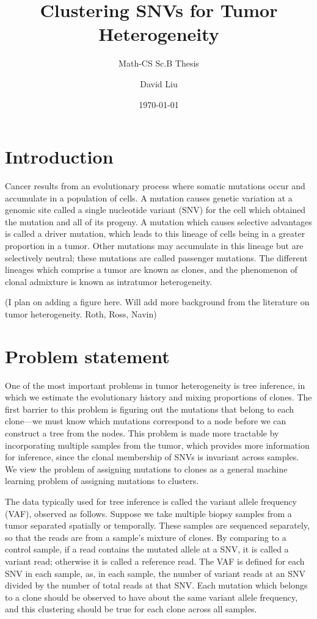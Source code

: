 \documentclass[11pt]{article}
\title{Clustering SNVs for Tumor Heterogeneity}
\subtitle{Math-CS Sc.B Thesis}
\date{\today}
\author{David Liu}
\begin{document}
\maketitle
\section{Introduction}
Cancer results from an evolutionary process where somatic mutations occur and accumulate in a population of cells. A mutation causes genetic variation at a genomic site called a single nucleotide variant (SNV) for the cell which obtained the mutation and all of its progeny. A mutation which causes selective advantages is called a driver mutation, which leads to this lineage of cells being in a greater proportion in a tumor. Other mutations may accumulate in this lineage but are selectively neutral; these mutations are called passenger mutations. The different lineages which comprise a tumor are known as clones, and the phenomenon of clonal admixture is known as intratumor heterogeneity. 

(I plan on adding a figure here. Will add more background from the literature on tumor heterogeneity. Roth, Ross, Navin)

\section{Problem statement}
One of the most important problems in tumor heterogeneity is tree inference, in which we estimate the evolutionary history and mixing proportions of clones. The first barrier to this problem is figuring out the mutations that belong to each clone---we must know which mutations correspond to a node before we can construct a tree from the nodes. This problem is made more tractable by incorporating multiple samples from the tumor, which provides more information for inference, since the clonal membership of SNVs is invariant across samples. We view the problem of assigning mutations to clones as a general machine learning problem of assigning mutations to clusters.

The data typically used for tree inference is called the variant allele frequency (VAF), observed as follows. Suppose we take multiple biopsy samples from a tumor separated spatially or temporally. These samples are sequenced separately, so that the reads are from a sample's mixture of clones. By comparing to a control sample, if a read contains the mutated allele at a SNV, it is called a variant read; otherwise it is called a reference read. The VAF is defined for each SNV in each sample, as, in each sample, the number of variant reads at an SNV divided by the number of total reads at that SNV. Each mutation which belongs to a clone should be observed to have about the same variant allele frequency, and this clustering should be true for each clone across all samples.
\end{document}
